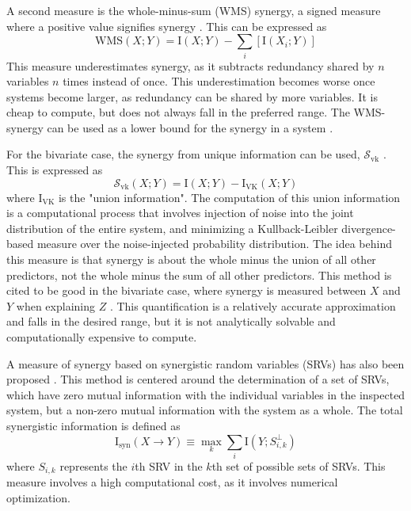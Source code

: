 \documentclass[../main.tex]{subfiles}
\begin{document}
A second measure is the whole-minus-sum (WMS) synergy, a signed measure where a positive value
signifies synergy \cite{gawne1993independent, griffith2014quantifying}.
This can be expressed as
%
\begin{equation}
\mathrm{WMS} \left( X;Y \right) = \mathrm{I} \left( X;Y \right) - \sum_i [\mathrm{I} \left( X_i;Y \right)]
\label{WMS}
\end{equation}
%
This measure underestimates synergy, as it subtracts redundancy shared by $n$ variables $n$ times instead of once.
This underestimation becomes worse once systems become larger, as redundancy can be shared by more variables.
It is cheap to compute, but does not always fall in the preferred range.
The WMS-synergy can be used as a lower bound for the synergy in a system \cite{griffith2014quantifying, olbrich2015information}.

For the bivariate case, the synergy from unique information can be used, $\mathcal{S}_\mathrm{vk}$ \cite{bertschinger2014quantifying, griffith2014quantifying, olbrich2015information}.
This is expressed as
\begin{equation}
\mathcal{S}_\mathrm{vk} \left( X;Y \right) = \mathrm{I}\left( X;Y \right) - \mathrm{I}_\mathrm{VK} \left( X;Y \right)
\end{equation}
%
where $\mathrm{I}_\mathrm{VK}$ is the "union information".
The computation of this union information is a computational process that involves injection of noise into the joint distribution of the entire system, and minimizing a Kullback-Leibler divergence-based measure over the noise-injected probability distribution.
The idea behind this measure is that synergy is about the whole minus the union of all other predictors, not the whole minus the sum of all other predictors.
This method is cited to be good in the bivariate case, where synergy is measured between $X$ and $Y$ when explaining $Z$ \cite{olbrich2015information}.
This quantification is a relatively accurate approximation and falls in the desired range, but it is not analytically solvable and computationally expensive to compute.

A measure of synergy based on synergistic random variables (SRVs) has also been proposed \cite{quax2017quantifying}.
This method is centered around the determination of a set of SRVs, which have zero mutual information with the individual variables in the inspected system, but a non-zero mutual information with the system as a whole.
The total synergistic information is defined as
\begin{equation}
\label{SRV}
\mathrm{I}_\mathrm{syn}\left( X \rightarrow Y\right) \equiv \max_k \sum_i \mathrm{I}\left( Y ; S_{i,k}^\perp \right)
\end{equation}
where $S_{i,k}$ represents the $i$th SRV in the $k$th set of possible sets of SRVs.
This measure involves a high computational cost, as it involves numerical optimization.
\end{document}
